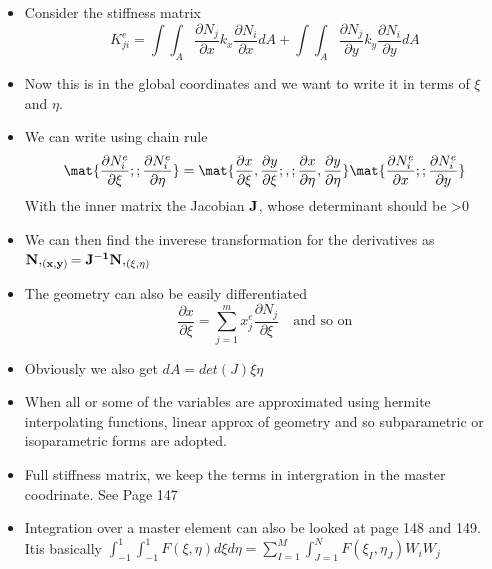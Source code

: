 	\begin{frame}
		\begin{itemize}
			\item Consider the stiffness matrix 
			\begin{equation}
				K^e_{ji} =  \int\int _A \frac{\partial N_j}{\partial x} k_x \frac{\partial  N_i }{\partial x} dA +
				\int\int _A \frac{\partial N_j}{\partial y} k_y \frac{\partial N_i }{\partial y} dA
			\end{equation}
			\item Now this is in the global coordinates and we want to write it in terms of $\xi$ and $\eta$. 
			\item We can write using chain rule 
			\begin{equation}
				\mat{\frac{\partial N_i^e}{\partial \xi }; ;\frac{\partial N_i^e}{\partial \eta}} = \mat{\frac{\partial x}{\partial \xi},\frac{\partial y}{\partial \xi}; , ;\frac{\partial x}{\partial \eta},\frac{\partial y}{\partial \eta}}
				\mat{\frac{\partial N_i^e}{\partial x }; ;\frac{\partial N_i^e}{\partial y}}
			\end{equation}
			With the inner matrix the Jacobian $\mathbf{J}$, whose determinant should be >0
			\item We can then find the inverese transformation for the derivatives as $\mathbf{ N,_{(x,y)} = J^{-1}N,_{(\xi,\eta)}}$
			\item The geometry can also be easily differentiated
			\begin{equation}
			 \frac{\partial x}{\partial \xi} = \sum_{j=1}^{m} x_j^e \frac{\partial N_j}{\partial \xi} \quad \text{and so on}
			\end{equation}
		\end{itemize}
	\end{frame}



	\begin{frame}
		\begin{itemize}
			\item Obviously we also get $dA = det(J)\xi\eta$
			\item When all or some of the variables are approximated using hermite interpolating functions, linear approx of geometry and so subparametric or isoparametric forms are adopted.
			\item  Full stiffness matrix, we keep the terms in intergration in the master coodrinate. See Page 147
			\item Integration over a master element can also be looked at page 148 and 149. Itis basically $\int_{-1}^{1}\int_{-1}^{1} F(\xi,\eta) d\xi d\eta = \sum_{I=1}^{M} \int_{J=1}^{N} F(\xi_I,\eta_J) W_i W_j$
		\end{itemize}
	\end{frame}


